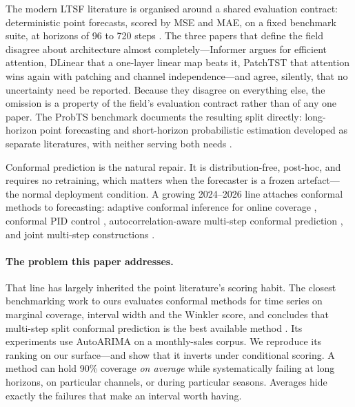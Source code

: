 \documentclass[11pt]{article}
\begin{document}
The modern LTSF literature is organised around a shared evaluation contract: deterministic point forecasts, scored by MSE and MAE, on a fixed benchmark suite, at horizons of 96 to 720 steps \citep{informer,dlinear,patchtst}. The three papers that define the field disagree about architecture almost completely---Informer argues for efficient attention, DLinear that a one-layer linear map beats it, PatchTST that attention wins again with patching and channel independence---and agree, silently, that no uncertainty need be reported. Because they disagree on everything else, the omission is a property of the field's evaluation contract rather than of any one paper. The ProbTS benchmark documents the resulting split directly: long-horizon point forecasting and short-horizon probabilistic estimation developed as separate literatures, with neither serving both needs \citep{probts}.

Conformal prediction is the natural repair. It is distribution-free, post-hoc, and requires no retraining, which matters when the forecaster is a frozen artefact---the normal deployment condition. A growing 2024--2026 line attaches conformal methods to forecasting: adaptive conformal inference for online coverage \citep{aci}, conformal PID control \citep{cpid}, autocorrelation-aware multi-step conformal prediction \citep{acmcp}, and joint multi-step constructions \citep{bellman,copulacpts}.

\paragraph{The problem this paper addresses.} That line has largely inherited the point literature's scoring habit. The closest benchmarking work to ours evaluates conformal methods for time series on marginal coverage, interval width and the Winkler score, and concludes that multi-step split conformal prediction is the best available method \citep{cpsurvey}. Its experiments use AutoARIMA on a monthly-sales corpus. We reproduce its ranking on our surface---and show that it inverts under conditional scoring. A method can hold 90\% coverage \emph{on average} while systematically failing at long horizons, on particular channels, or during particular seasons. Averages hide exactly the failures that make an interval worth having.
\end{document}
